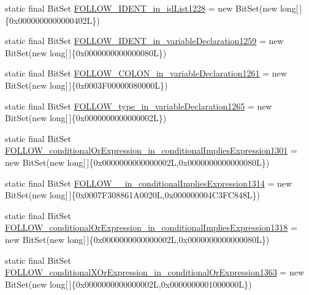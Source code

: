 \begin{DoxyCompactItemize}
static final Bit\-Set \hyperlink{classorg_1_1tzi_1_1use_1_1parser_1_1shell_1_1_shell_command_parser_acad1059007732fa65db457a5a6539ffc}{F\-O\-L\-L\-O\-W\-\_\-\-I\-D\-E\-N\-T\-\_\-in\-\_\-id\-List1228} = new Bit\-Set(new long\mbox{[}$\,$\mbox{]}\{0x0000000000000402\-L\})
\item 
static final Bit\-Set \hyperlink{classorg_1_1tzi_1_1use_1_1parser_1_1shell_1_1_shell_command_parser_ab58bd695458aaa14d18bc1c506f621b7}{F\-O\-L\-L\-O\-W\-\_\-\-I\-D\-E\-N\-T\-\_\-in\-\_\-variable\-Declaration1259} = new Bit\-Set(new long\mbox{[}$\,$\mbox{]}\{0x0000000000000080\-L\})
\item 
static final Bit\-Set \hyperlink{classorg_1_1tzi_1_1use_1_1parser_1_1shell_1_1_shell_command_parser_a97f532fbd92d0c1012afaed212d079d4}{F\-O\-L\-L\-O\-W\-\_\-\-C\-O\-L\-O\-N\-\_\-in\-\_\-variable\-Declaration1261} = new Bit\-Set(new long\mbox{[}$\,$\mbox{]}\{0x0003\-F00000080000\-L\})
\item 
static final Bit\-Set \hyperlink{classorg_1_1tzi_1_1use_1_1parser_1_1shell_1_1_shell_command_parser_ac29b9756e4a7ddddfd20ec76740277da}{F\-O\-L\-L\-O\-W\-\_\-type\-\_\-in\-\_\-variable\-Declaration1265} = new Bit\-Set(new long\mbox{[}$\,$\mbox{]}\{0x0000000000000002\-L\})
\item 
static final Bit\-Set \hyperlink{classorg_1_1tzi_1_1use_1_1parser_1_1shell_1_1_shell_command_parser_a6388fc1e7648dec020ceb6c3afd147ae}{F\-O\-L\-L\-O\-W\-\_\-conditional\-Or\-Expression\-\_\-in\-\_\-conditional\-Implies\-Expression1301} = new Bit\-Set(new long\mbox{[}$\,$\mbox{]}\{0x0000000000000002\-L,0x0000000000000080\-L\})
\item 
static final Bit\-Set \hyperlink{classorg_1_1tzi_1_1use_1_1parser_1_1shell_1_1_shell_command_parser_a62c9749b88d546572520f23b6aec4eac}{F\-O\-L\-L\-O\-W\-\_\-\_\-in\-\_\-conditional\-Implies\-Expression1314} = new Bit\-Set(new long\mbox{[}$\,$\mbox{]}\{0x0007\-F308861\-A0020\-L,0x000000004\-C3\-F\-C848\-L\})
\item 
static final Bit\-Set \hyperlink{classorg_1_1tzi_1_1use_1_1parser_1_1shell_1_1_shell_command_parser_a56a85607f4d80dbf0699932a8f69429a}{F\-O\-L\-L\-O\-W\-\_\-conditional\-Or\-Expression\-\_\-in\-\_\-conditional\-Implies\-Expression1318} = new Bit\-Set(new long\mbox{[}$\,$\mbox{]}\{0x0000000000000002\-L,0x0000000000000080\-L\})
\item 
static final Bit\-Set \hyperlink{classorg_1_1tzi_1_1use_1_1parser_1_1shell_1_1_shell_command_parser_a36cc5af8e07faeed9fbe4ab5cc2b9a3f}{F\-O\-L\-L\-O\-W\-\_\-conditional\-X\-Or\-Expression\-\_\-in\-\_\-conditional\-Or\-Expression1363} = new Bit\-Set(new long\mbox{[}$\,$\mbox{]}\{0x0000000000000002\-L,0x0000000001000000\-L\})

\end{DoxyCompactItemize}
